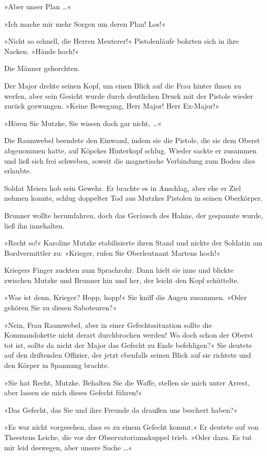 »Aber unser Plan …«

»Ich mache mir mehr Sorgen um deren Plan! Los!«

»Nicht so schnell, die Herren Meuterer!« Pistolenläufe bohrten sich
in ihre Nacken. »Hände hoch!«

Die Männer gehorchten.

Der Major drehte seinen Kopf, um einen Blick auf die Frau hinter
ihnen zu werfen, aber sein Gesicht wurde durch deutlichen Druck mit
der Pistole wieder zurück gezwungen. »Keine Bewegung, Herr Major!
Herr Ex-Major!«

»Hören Sie Mutzke, Sie wissen doch gar nicht, …«

Die Raumwebel beendete den Einwand, indem sie die Pistole, die sie
dem Oberst abgenommen hatte, auf Köpckes Hinterkopf schlug. Wieder
sackte er zusammen und ließ sich frei schweben, soweit die
magnetische Verbindung zum Boden dies erlaubte.

Soldat Meiers hob sein Gewehr. Er brachte es in Anschlag, aber ehe
er Ziel nehmen konnte, schlug doppelter Tod aus Mutzkes Pistolen in
seinen Oberkörper.

Brunner wollte herumfahren, doch das Geräusch des Hahns, der
gespannte wurde, ließ ihn innehalten.

»Recht so!« Karoline Mutzke stabilisierte ihren Stand und nickte
der Soldatin am Bordvermittler zu: »Krieger, rufen Sie Oberleutnant
Martens hoch!«

Kriegers Finger zuckten zum Sprachrohr. Dann hielt sie inne und
blickte zwischen Mutzke und Brunner hin und her, der leicht den
Kopf schüttelte.

»Was ist denn, Krieger? Hopp, hopp!« Sie kniff die Augen zusammen.
»Oder gehören Sie zu diesen Saboteuren?«

»Nein, Frau Raumwebel, aber in einer Gefechtssituation sollte die
Kommandokette nicht derart durchbrochen werden! Wo doch schon der
Oberst tot ist, sollte da nicht der Major das Gefecht zu Ende
befehligen?« Sie deutete auf den driftenden Offizier, der jetzt
ebenfalls seinen Blick auf sie richtete und den Körper in Spannung
brachte.

»Sie hat Recht, Mutzke. Behalten Sie die Waffe, stellen sie mich
unter Arrest, aber lassen sie mich dieses Gefecht führen!«

»Das Gefecht, das Sie und ihre Freunde da draußen uns beschert
haben?«

»Es war nicht vorgesehen, dass es zu einem Gefecht kommt.« Er
deutete auf von Theestens Leiche, die vor der Observatoriumskuppel
trieb. »Oder dazu. Es tut mir leid deswegen, aber unsere Sache …«

